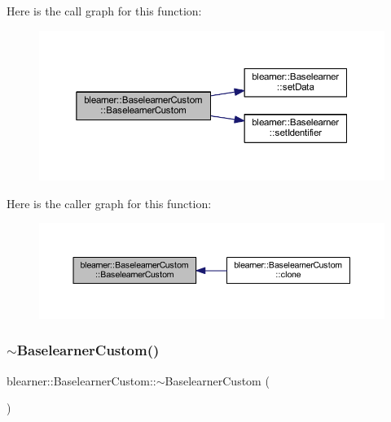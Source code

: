 Here is the call graph for this function\+:\nopagebreak
\begin{figure}[H]
\begin{center}
\leavevmode
\includegraphics[width=350pt]{classblearner_1_1_baselearner_custom_ac812a6b0d79f75560caa91ec101ca6e3_cgraph}
\end{center}
\end{figure}
Here is the caller graph for this function\+:\nopagebreak
\begin{figure}[H]
\begin{center}
\leavevmode
\includegraphics[width=350pt]{classblearner_1_1_baselearner_custom_ac812a6b0d79f75560caa91ec101ca6e3_icgraph}
\end{center}
\end{figure}
\mbox{\label{classblearner_1_1_baselearner_custom_a5238f894da2b3e746b3a9e647b4ba6e2}} 
\subsubsection{\texorpdfstring{$\sim$\+Baselearner\+Custom()}{~BaselearnerCustom()}}
{\footnotesize\ttfamily blearner\+::\+Baselearner\+Custom\+::$\sim$\+Baselearner\+Custom (\begin{DoxyParamCaption}{ }\end{DoxyParamCaption})}



